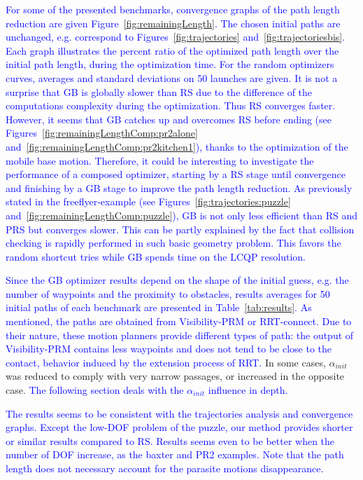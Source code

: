 \documentclass{tADR2e}
\begin{document}
\textcolor{blue}{
For some of the presented benchmarks, convergence graphs of the path 
length reduction are 
given Figure~\ref{fig:remainingLength}. The chosen initial paths are unchanged, 
e.g. correspond to Figures~\ref{fig:trajectories} and~\ref{fig:trajectoriesbis}. 
Each graph illustrates the percent ratio of the optimized path length over the initial path length, during the optimization time.
For the random optimizers curves, averages and standard deviations on 50 
launches are given. It is not a surprise that GB is globally slower than RS due to the difference of the computations complexity during the optimization. Thus RS converges faster. However, it seems that GB catches up and overcomes RS before ending (see Figures~\ref{fig:remainingLengthComp:pr2alone} and~\ref{fig:remainingLengthComp:pr2kitchen1}), thanks to the optimization of the mobile base motion. Therefore, it could be interesting to investigate the performance of a composed optimizer, starting by a RS stage until convergence and finishing by a GB stage to improve the path length reduction.
As previously stated in the freeflyer-example (see Figures~\ref{fig:trajectories:puzzle} and~\ref{fig:remainingLengthComp:puzzle}), GB is not only less efficient than RS and PRS but converges slower. 
This can be partly explained by the fact that collision checking is rapidly performed in such basic geometry problem. This favors the random shortcut tries while GB spends time on the LCQP resolution.
}

\vspace{0.3cm}

\textcolor{blue}{
Since the GB optimizer results depend on the shape of the initial guess, e.g. the number of waypoints and the proximity to obstacles, results averages for 50 initial paths of each benchmark are presented in Table~\ref{tab:results}. As mentioned, the paths are obtained from Visibility-PRM or RRT-connect. Due to their nature, these motion planners provide different types of path: the output of Visibility-PRM contains less waypoints and does not tend to be close to the contact, behavior induced by the extension process of RRT.
}
In some cases, $\alpha_{init}$ was 
reduced to comply with very narrow passages, or increased in the opposite case.
\textcolor{blue}{
The following section deals with the $\alpha_{init}$ influence in depth.
}

\textcolor{blue}{
The results seems to be consistent with the trajectories analysis and convergence graphs. Except the low-DOF problem of the puzzle, our method provides 
shorter or similar results compared to RS. Results seems even to be better when the number of DOF increase, as the baxter and PR2 examples.
Note that the path length does not necessary account for the parasite motions disappearance.
}
\end{document}
